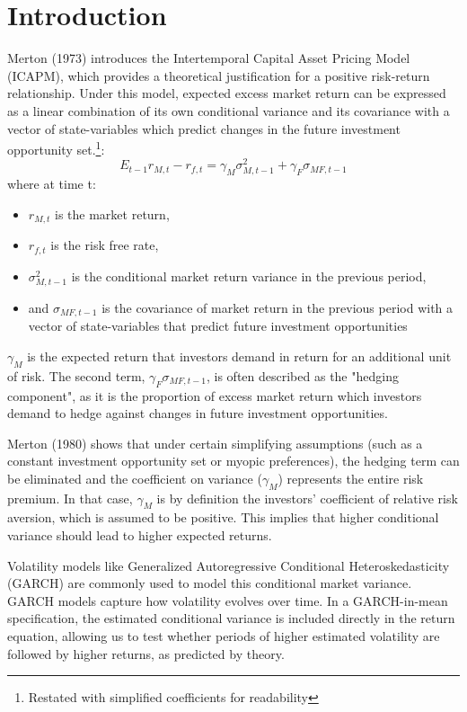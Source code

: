 \documentclass[12pt]{article}
\begin{document}
\section{Introduction}
Merton (1973) introduces the Intertemporal Capital Asset Pricing Model (ICAPM), which provides a theoretical justification for a positive risk-return relationship. Under this model, expected excess market return can be expressed as a linear combination of its own conditional variance and its covariance with a vector of state-variables which predict changes in the future investment opportunity set.\footnote{Restated with simplified coefficients for readability}: 
\begin{equation}
\nonumber
E_{t-1}r_{M,t}-r_{f,t}=\gamma_M\sigma_{M,t-1}^2+\gamma_F\sigma_{MF,t-1}
\end{equation}
\noindent where at time t:
\begin{itemize}
\item$r_{M,t}$ is the market return,
\item$r_{f,t}$ is the risk free rate,
\item$\sigma_{M,t-1}^2$ is the conditional market return variance in the previous period,
\item and $\sigma_{MF,t-1}$ is the covariance of market return in the previous period with a vector of state-variables that predict future investment opportunities
\end{itemize}
$\gamma_M$ is the expected return that investors demand in return for an additional unit of risk. The second term, $\gamma_F\sigma_{MF,t-1}$, is often described as the "hedging component", as it is the proportion of excess market return which investors demand to hedge against changes in future investment opportunities.\par
Merton (1980) shows that under certain simplifying assumptions (such as a constant investment opportunity set or myopic preferences), the hedging term can be eliminated and the coefficient on variance ($\gamma_M$) represents the entire risk premium. In that case, $\gamma_M$ is by definition the investors' coefficient of relative risk aversion, which is assumed to be positive. This implies that higher conditional variance should lead to higher expected returns. \par
Volatility models like Generalized Autoregressive Conditional Heteroskedasticity (GARCH) are commonly used to model this conditional market variance. GARCH models capture how volatility evolves over time. In a GARCH-in-mean specification, the estimated conditional variance is included directly in the return equation, allowing us to test whether periods of higher estimated volatility are followed by higher returns, as predicted by theory.\par
\end{document}
